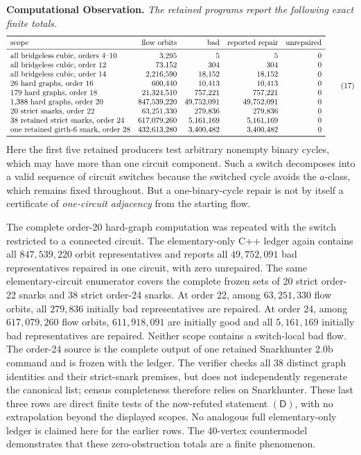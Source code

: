 \documentclass[11pt]{article}
\theoremstyle{definition}
\theoremstyle{remark}
\begin{document}
\medskip
\noindent
\textbf{Computational Observation.}
\emph{The retained programs report the following exact finite totals.}
\[
\begin{array}{lrrrr}
\toprule
\text{scope}&\text{flow orbits}&\text{bad}&
\text{reported repair}&\text{unrepaired}\\
\midrule
\text{all bridgeless cubic, orders }4\text{--}10
 &3{,}295&5&5&0\\
\text{all bridgeless cubic, order }12
 &73{,}152&304&304&0\\
\text{all bridgeless cubic, order }14
 &2{,}216{,}590&18{,}152&18{,}152&0\\
\text{26 hard graphs, order }16
 &600{,}440&10{,}413&10{,}413&0\\
\text{179 hard graphs, order }18
 &21{,}324{,}510&757{,}221&757{,}221&0\\
\text{1,388 hard graphs, order }20
 &847{,}539{,}220&49{,}752{,}091&49{,}752{,}091&0\\
\text{20 strict snarks, order }22
 &63{,}251{,}330&279{,}836&279{,}836&0\\
\text{38 retained strict snarks, order }24
 &617{,}079{,}260&5{,}161{,}169&5{,}161{,}169&0\\
\text{one retained girth-6 snark, order }28
 &432{,}613{,}280&3{,}400{,}482&3{,}400{,}482&0\\
\bottomrule
\end{array}                                                       \tag{17}
\]
Here the first five retained producers test arbitrary nonempty binary
cycles, which may have more than one circuit component.  Such a switch
decomposes into a valid sequence of circuit switches because the switched
cycle avoids the \(a\)-class, which remains fixed throughout.  But a
one-binary-cycle repair is not by itself a certificate of
\emph{one-circuit adjacency} from the starting flow.

The complete order-20 hard-graph computation was repeated with the switch
restricted to a connected circuit.  The elementary-only C++ ledger again
contains all \(847{,}539{,}220\) orbit representatives and reports all
\(49{,}752{,}091\) bad representatives repaired in one circuit, with zero
unrepaired.  The same elementary-circuit enumerator covers the complete
frozen sets of 20 strict order-22 snarks and 38 strict order-24 snarks.
At order 22, among \(63{,}251{,}330\) flow orbits, all \(279{,}836\)
initially bad representatives are repaired.  At order 24, among
\(617{,}079{,}260\) flow orbits, \(611{,}918{,}091\) are initially good
and all \(5{,}161{,}169\) initially bad representatives are repaired.
Neither scope contains a switch-local bad flow.  The order-24 source is
the complete output of one retained Snarkhunter 2.0b command and is
frozen with the ledger.  The verifier checks all 38 distinct graph
identities and their strict-snark premises, but does not independently
regenerate the canonical list; census completeness therefore relies on
Snarkhunter.  These last three rows are direct finite tests of the
now-refuted statement \((\mathsf D)\), with no extrapolation beyond the
displayed scopes.  No analogous full elementary-only ledger is claimed
here for the earlier rows.  The
\(40\)-vertex countermodel demonstrates that these zero-obstruction
totals are a finite phenomenon.
\end{document}

